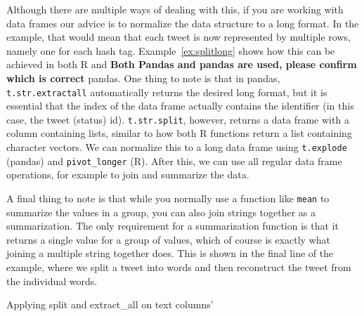 Although there are multiple ways of dealing with this,
if you are working with data frames our advice is to normalize the data structure to a long format.
In the example, that would mean that each tweet is now represented by multiple rows,
namely one for each hash tag.
Example~\ref{ex:splitlong} shows how this can be achieved in both R and {\bf Both Pandas and pandas are used, please confirm which is correct} pandas.
One thing to note is that in pandas,
\verb!t.str.extractall! automatically returns the desired long format,
but it is essential that the index of the data frame actually contains the identifier (in this case, the tweet (status) id).
\verb!t.str.split!, however, returns a data frame with a column containing lists,
similar to how both R functions return a list containing character vectors.
We can normalize this to a long data frame using \texttt{t.explode} (pandas) and \texttt{pivot\_longer} (R).
After this, we can use all regular data frame operations, for example to join and summarize the data.

A final thing to note is that  while you normally use a function like \texttt{mean} to summarize the values in a group,
you can also join strings together as a summarization.
The only requirement for a summarization function is that it returns a single value for a group of values,
which of course is exactly what joining a multiple string together does.
This is shown in the final line of the example, where we split a tweet into words and then reconstruct the tweet from the individual words.



\begin{ccsexample}
  \caption{Applying split and extract\_all on text columns'}\label{ex:splitlong}
\end{ccsexample}




